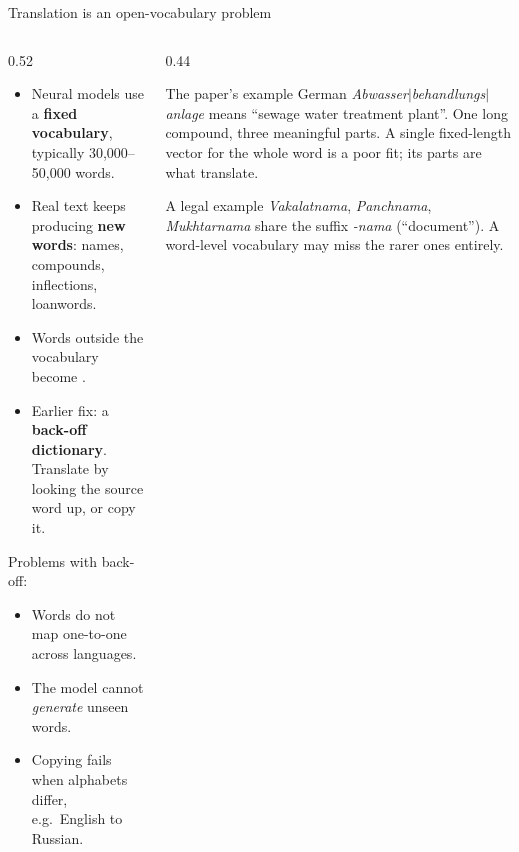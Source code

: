 \documentclass[aspectratio=169,11pt]{beamer}
\begin{document}
\begin{frame}{Translation is an open-vocabulary problem}
  \begin{columns}[T]
    \begin{column}{0.52\textwidth}
      \small
      \begin{itemize}
        \item Neural models use a \textbf{fixed vocabulary}, typically 30,000--50,000 words.
        \item Real text keeps producing \textbf{new words}: names, compounds, inflections, loanwords.
        \item Words outside the vocabulary become .
        \item Earlier fix: a \textbf{back-off dictionary}. Translate  by looking the source word up, or copy it.
      \end{itemize}
      \vspace{1mm}
      Problems with back-off:
      \begin{itemize}
        \item Words do not map one-to-one across languages.
        \item The model cannot \emph{generate} unseen words.
        \item Copying fails when alphabets differ, e.g.\ English to Russian.
      \end{itemize}
    \end{column}
    \begin{column}{0.44\textwidth}
      \begin{exampleblock}{The paper's example}
        \small
        German \emph{Abwasser$|$behandlungs$|$anlage} means ``sewage water treatment plant''.
        One long compound, three meaningful parts. A single fixed-length vector for the whole word is a poor fit; its parts are what translate.
      \end{exampleblock}
      \begin{exampleblock}{A legal example}
        \small
        \emph{Vakalatnama}, \emph{Panchnama}, \emph{Mukhtarnama} share the suffix \emph{-nama} (``document''). A word-level vocabulary may miss the rarer ones entirely.
      \end{exampleblock}
    \end{column}
  \end{columns}
\end{frame}
\end{document}
